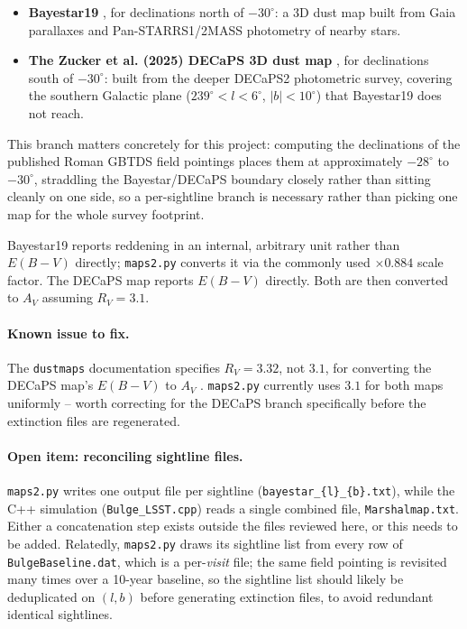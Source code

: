 \documentclass[english,10pt,a4paper]{article}
\begin{document}
	\begin{itemize}
		\item \textbf{Bayestar19} \cite{Green2019Bayestar}, for declinations north of $-30^{\circ}$: a 3D dust map built from Gaia parallaxes and Pan-STARRS1/2MASS photometry of nearby stars.
		\item \textbf{The Zucker et al. (2025) DECaPS 3D dust map} \cite{Zucker2025DECaPS}, for declinations south of $-30^{\circ}$: built from the deeper DECaPS2 photometric survey, covering the southern Galactic plane ($239^{\circ}<l<6^{\circ}$, $|b|<10^{\circ}$) that Bayestar19 does not reach.
	\end{itemize}
	
	This branch matters concretely for this project: computing the declinations of the published Roman GBTDS field pointings places them at approximately $-28^{\circ}$ to $-30^{\circ}$, straddling the Bayestar/DECaPS boundary closely rather than sitting cleanly on one side, so a per-sightline branch is necessary rather than picking one map for the whole survey footprint.
	
	Bayestar19 reports reddening in an internal, arbitrary unit rather than $E(B\!-\!V)$ directly; \texttt{maps2.py} converts it via the commonly used $\times 0.884$ scale factor. The DECaPS map reports $E(B\!-\!V)$ directly. Both are then converted to $A_V$ assuming $R_V=3.1$.
	
	\paragraph{Known issue to fix.} The \texttt{dustmaps} documentation specifies $R_V=3.32$, not $3.1$, for converting the DECaPS map's $E(B\!-\!V)$ to $A_V$ \cite{DustmapsDocs}. \texttt{maps2.py} currently uses $3.1$ for both maps uniformly -- worth correcting for the DECaPS branch specifically before the extinction files are regenerated.
	
	\paragraph{Open item: reconciling sightline files.} \texttt{maps2.py} writes one output file per sightline (\texttt{bayestar\_\{l\}\_\{b\}.txt}), while the C++ simulation (\texttt{Bulge\_LSST.cpp}) reads a single combined file, \texttt{Marshalmap.txt}. Either a concatenation step exists outside the files reviewed here, or this needs to be added. Relatedly, \texttt{maps2.py} draws its sightline list from every row of \texttt{BulgeBaseline.dat}, which is a per-\emph{visit} file; the same field pointing is revisited many times over a 10-year baseline, so the sightline list should likely be deduplicated on $(l,b)$ before generating extinction files, to avoid redundant identical sightlines.
	
\end{document}
